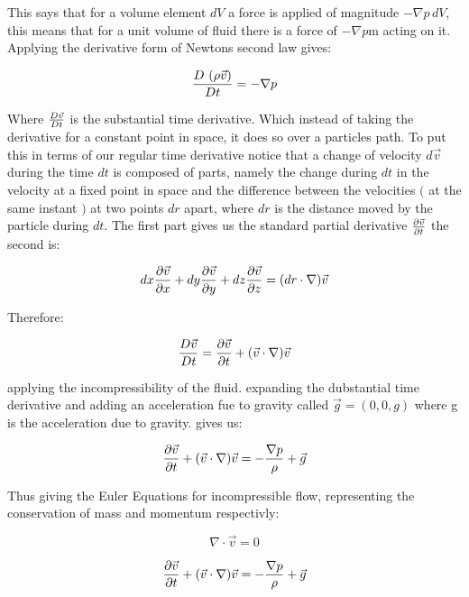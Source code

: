 \documentclass{article}
\begin{document}
\noindent This says that for a volume element $dV$ a force is applied of magnitude $ - \nabla p \,dV$, this means that for a unit volume of fluid there is a force of $- \nabla p$m acting on it. Applying the derivative form of Newtons second law gives:

\begin{equation}
    \label{Flow out of V}
    {D\ (\rho \vec{v})\over Dt} = - \nabla p
\end{equation}

\noindent Where ${D\vec{v}\over Dt}$ is the substantial time derivative. Which instead of taking the derivative for a constant point in space, it does so over a particles path. To put this in terms of our regular time derivative notice that a change of velocity $d\vec{v}$ during the time $dt$ is composed of parts, namely the change during $dt$ in the velocity at a fixed point in space and the difference between the velocities $($ at the same instant $)$ at two points $dr$ apart, where $dr$ is the distance moved by the particle during $dt$. The first part gives us the standard partial derivative ${\partial \vec{v}\over \partial t}$ the second is:

\begin{equation}
    \label{Flow out of V}
    dx{\partial \vec{v} \over \partial x} + dy{\partial \vec{v} \over \partial y} + dz{\partial \vec{v} \over \partial z} = (dr \cdot \nabla) \vec{v}
\end{equation}

\noindent Therefore:

\begin{equation}
    \label{Flow out of V}
    {D\vec{v} \over Dt} = {\partial \vec{v} \over \partial t} + (\vec{v} \cdot \nabla) \vec{v}
\end{equation}

\noindent applying the incompressibility of the fluid. expanding the dubstantial time derivative and adding an acceleration fue to gravity called $ \vec{g} = (0,0,g) $ where g is the acceleration due to gravity. gives us:

\begin{equation}
    \label{Flow out of V}
    {\partial \vec{v}\over \partial t} + (\vec{v} \cdot \nabla)\vec{v} = -{ \nabla p \over \rho } + \vec{g}
\end{equation}

\noindent Thus giving the Euler Equations for incompressible flow, representing the conservation of mass and momentum respectivly:


\begin{equation}
    \label{Greens formula}
    \nabla \cdot \vec{v} = 0
\end{equation}

\begin{equation}
    \label{Flow out of V}
    {\partial \vec{v}\over \partial t} + (\vec{v} \cdot \nabla)\vec{v} = -{ \nabla p \over \rho } + \vec{g}
\end{equation}
\end{document}
